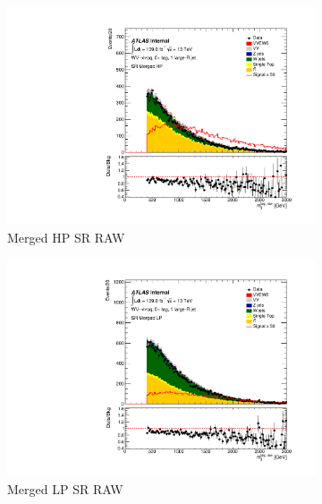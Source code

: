 \clearpage
\begin{figure}[ht]
    \centering
    \begin{subfigure}[b]{0.3\textwidth}
        \centering
        \includegraphics[width=\textwidth]{figures/mjjreweight1lep/SR_50/stacked_plot_merged_tagMjj_MjjWeightMerged.pdf}
        \caption{Merged HP SR RAW}
        \label{fig:MC16ADE_Merged_HP_SR_Before}
    \end{subfigure}
    \hfill
    \begin{subfigure}[b]{0.3\textwidth}
        \centering
        \includegraphics[width=\textwidth]{figures/mjjreweight1lep/SR_80/stacked_plot_merged_tagMjj_MjjWeightMerged.pdf}
        \caption{Merged LP SR RAW}
        \label{fig:MC16ADE_Merged_LP_SR_Before}
    \end{subfigure}
    \hfill
    \begin{subfigure}[b]{0.3\textwidth}

\end{subfigure}
\end{figure}

